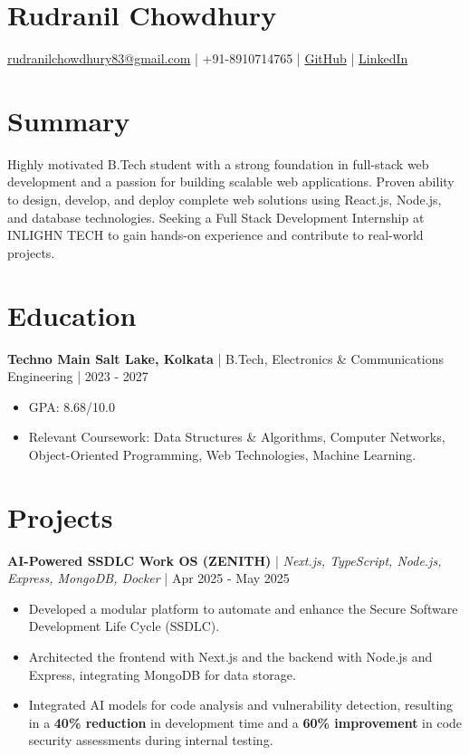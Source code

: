\documentclass{article}
\begin{document}
\section*{\LARGE Rudranil Chowdhury}
\href{mailto:rudranilchowdhury83@gmail.com}{rudranilchowdhury83@gmail.com} | +91-8910714765 | \href{https://github.com/[GitHub Link]}{GitHub} | \href{https://linkedin.com/[LinkedIn Link]}{LinkedIn}

\section*{Summary}
Highly motivated B.Tech student with a strong foundation in full-stack web development and a passion for building scalable web applications. Proven ability to design, develop, and deploy complete web solutions using React.js, Node.js, and database technologies. Seeking a Full Stack Development Internship at INLIGHN TECH to gain hands-on experience and contribute to real-world projects.

\section*{Education}
\textbf{Techno Main Salt Lake, Kolkata} | B.Tech, Electronics \& Communications Engineering | 2023 - 2027
\begin{itemize}[leftmargin=*, nosep]
    \item GPA: 8.68/10.0
    \item Relevant Coursework: Data Structures \& Algorithms, Computer Networks, Object-Oriented Programming, Web Technologies, Machine Learning.
\end{itemize}

\section*{Projects}
\textbf{AI-Powered SSDLC Work OS (ZENITH)} | \textit{Next.js, TypeScript, Node.js, Express, MongoDB, Docker} | Apr 2025 - May 2025
\begin{itemize}[leftmargin=*, nosep]
    \item Developed a modular platform to automate and enhance the Secure Software Development Life Cycle (SSDLC).
    \item Architected the frontend with Next.js and the backend with Node.js and Express, integrating MongoDB for data storage.
    \item Integrated AI models for code analysis and vulnerability detection, resulting in a \textbf{40\% reduction} in development time and a \textbf{60\% improvement} in code security assessments during internal testing.
\end{itemize}
\end{document}
